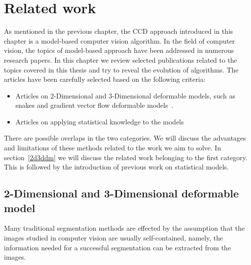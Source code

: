\chapter{Related work}
\label{chapter:related}

As mentioned in the previous chapter, the
CCD approach introduced in this chapter is a model-based computer
vision algorithm. In the field of
computer vision, the topics of model-based approach have been addressed in numerous research papers.
In this chapter we review selected publications related to the topics
covered in this thesis and try to reveal the evolution of algorithms. The
articles have been carefully selected based on the following criteria:
\begin{itemize}
\item Articles on 2-Dimensional and 3-Dimensional deformable models,
  such as snakes and gradient vector flow deformable models~\cite{xu2000gradient}.
\item Articles on applying statistical knowledge to the models
\end{itemize}
There are possible overlaps in the two categories. We will discuss the
advantages and limitations of these methods related to the work we aim
to solve. In section~\ref{2d3ddm} we will discuss the related work
belonging to the first category. This is followed by the introduction
of previous work on statistical models.

\section{2-Dimensional and 3-Dimensional deformable model}
\label{sec:2d3ddm}
Many traditional segmentation methods are effected by the assumption that the
images studied in computer vision are usually self-contained, namely,
the information needed for a successful segmentation can be extracted
from the images.

